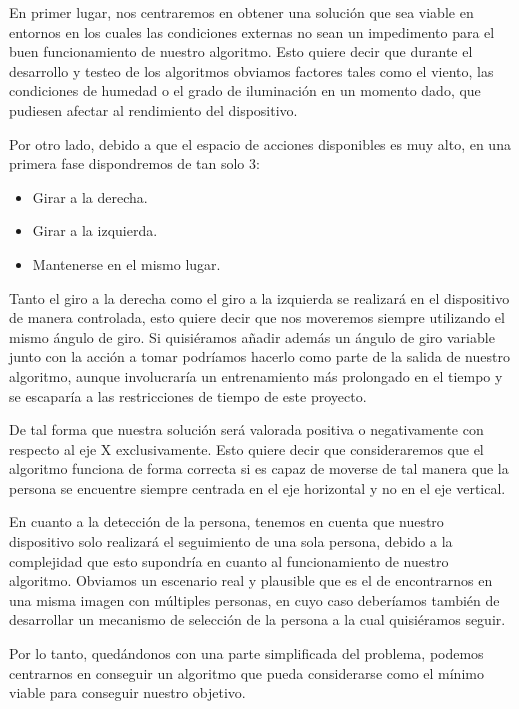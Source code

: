 En primer lugar, nos centraremos en obtener una solución que sea viable en entornos en los cuales las condiciones externas no sean un impedimento para el buen funcionamiento de nuestro algoritmo. Esto quiere decir que durante el desarrollo y testeo de los algoritmos obviamos factores tales como el viento, las condiciones de humedad o el grado de iluminación en un momento dado, que pudiesen afectar al rendimiento del dispositivo.

Por otro lado, debido a que el espacio de acciones disponibles es muy alto, en una primera fase dispondremos de tan solo 3: 

\begin{itemize}
  \item Girar a la derecha.
  \item Girar a la izquierda.
  \item Mantenerse en el mismo lugar.
\end{itemize}



Tanto el giro a la derecha como el giro a la izquierda se realizará en el dispositivo de manera controlada, esto quiere decir que nos moveremos siempre utilizando el mismo ángulo de giro. Si quisiéramos añadir además un ángulo de giro variable junto con la acción a tomar podríamos hacerlo como parte de la salida de nuestro algoritmo, aunque involucraría un entrenamiento más prolongado en el tiempo y se escaparía a las restricciones de tiempo de este proyecto.

De tal forma que nuestra solución será valorada positiva o negativamente con respecto al eje X exclusivamente. Esto quiere decir que consideraremos que el algoritmo funciona de forma correcta si es capaz de moverse de tal manera que la persona se encuentre siempre centrada en el eje horizontal y no en el eje vertical.

En cuanto a la detección de la persona, tenemos en cuenta que nuestro dispositivo solo realizará el seguimiento de una sola persona, debido a la complejidad que esto supondría en cuanto al funcionamiento de nuestro algoritmo. Obviamos un escenario real y plausible que es el de encontrarnos en una misma imagen con múltiples personas, en cuyo caso deberíamos también de desarrollar un mecanismo de selección de la persona a la cual quisiéramos seguir.

Por lo tanto, quedándonos con una parte simplificada del problema, podemos centrarnos en conseguir un algoritmo que pueda considerarse como el mínimo viable para conseguir nuestro objetivo.

